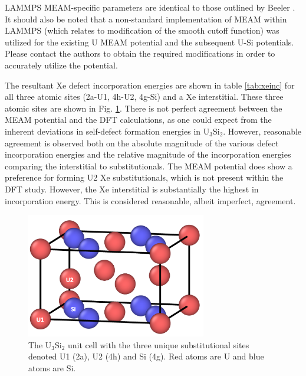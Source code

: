 \documentclass[review]{elsarticle}
\begin{document}
\FloatBarrier

LAMMPS MEAM-specific parameters are identical to those outlined by Beeler \cite{beelerusi}. It should also be noted that a non-standard implementation of MEAM within LAMMPS (which relates to modification of the smooth cutoff function) was utilized for the existing U MEAM potential and the subsequent U-Si potentials. Please contact the authors to obtain the required modifications in order to accurately utilize the potential. 

The resultant Xe defect incorporation energies are shown in table \ref{tab:xeinc} for all three atomic sites (2a-U1, 4h-U2, 4g-Si) and a Xe interstitial. These three atomic sites are shown in Fig. \ref{fig:defect_sites}. There is not perfect agreement between the MEAM potential and the DFT calculations, as one could expect from the inherent deviations in self-defect formation energies in U$_3$Si$_2$. However, reasonable agreement is observed both on the absolute magnitude of the various defect incorporation energies and the relative magnitude of the incorporation energies comparing the interstitial to substitutionals. The MEAM potential does show a preference for forming U2 Xe substitutionals, which is not present within the DFT study. However, the Xe interstitial is substantially the highest in incorporation energy. This is considered reasonable, albeit imperfect, agreement. 

\begin{figure}[hbt]
	\centering
	\includegraphics[width=0.7\textwidth]{defect_sites.png}
 \caption{ The U$_3$Si$_2$ unit cell with the three unique substitutional sites denoted U1 (2a), U2 (4h) and Si (4g). Red atoms are U and blue atoms are Si. }\label{fig:defect_sites}
\end{figure}
\end{document}
